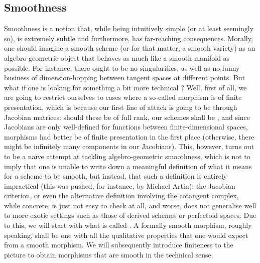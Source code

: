     \subsection{Smoothness}
        Smoothness is a notion that, while being intuitively simple (or at least seemingly so), is extremely subtle and furthermore, has far-reaching consequences. Morally, one should imagine a smooth scheme (or for that matter, a smooth variety) as an algebro-geometric object that behaves as much like a smooth manifold as possible. For instance, there ought to be no singularities, as well as no funny business of dimension-hopping between tangent spaces at different points. But what if one is looking for something a bit more technical ? Well, first of all, we are going to restrict ourselves to cases where a so-called  morphism is of finite presentation, which is because our first line of attack is going to be through Jacobian matrices: should these be of full rank, our schemes shall be , and since Jacobians are only well-defined for functions between finite-dimensional spaces,  morphisms had better be of finite presentation in the first place (otherwise, there might be infinitely many components in our Jacobians). This, however, turns out to be a na\"ive attempt at tackling algebro-geometric smoothness, which is not to imply that one is unable to write down a meaningful definition of what it means for a scheme to be smooth, but instead, that such a definition is entirely impractical (this was pushed, for instance, by Michael Artin): the Jacobian criterion, or even the alternative definition involving the cotangent complex, while concrete, is just not easy to check at all, and worse, does not generalise well to more exotic settings such as those of derived schemes or perfectoid spaces. Due to this, we will start with what is called . A formally smooth morphism, roughly speaking, shall be one with all the qualitative properties that one would expect from a smooth morphism. We will subsequently introduce finiteness to the picture to obtain morphisms that are smooth in the technical sense. 

